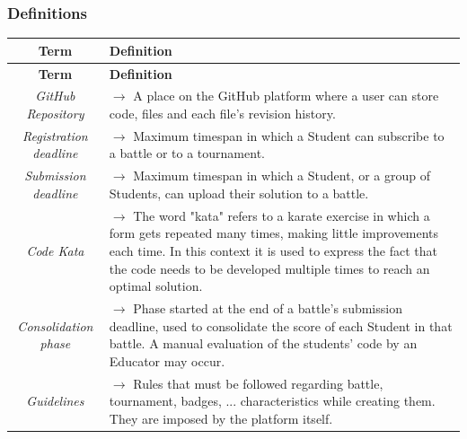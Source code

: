 \documentclass{article}
\begin{document}
\subsubsection{Definitions}
{\renewcommand{\arraystretch}{1.5}
\begin{xltabular}{\textwidth}{ >{\raggedright\arraybackslash}c >{\raggedright\arraybackslash}X }
    \hline
    \textbf{Term} & \textbf{Definition} \\
    \hline

    \endfirsthead   %

    \hline
    \textbf{Term} & \textbf{Definition} \\
    \hline

    \endhead    %

    \endfoot    %

    \endlastfoot    %

    \textit{GitHub Repository} & $\rightarrow$ A place on the GitHub platform where a user can store code, files and each file's revision history. \\
    \textit{Registration deadline} & $\rightarrow$ Maximum timespan in which a Student can subscribe to a battle or to a tournament. \\
    \textit{Submission deadline} & $\rightarrow$ Maximum timespan in which a Student, or a group of Students, can upload their solution to a battle. \\
    \textit{Code Kata} & $\rightarrow$ The word "kata" refers to a karate exercise in which a form gets repeated many times, 
    making little improvements each time.
    In this context it is used to express the fact that the code needs to be developed multiple times to reach an optimal solution. \\
    \textit{Consolidation phase} & $\rightarrow$ Phase started at the end of a battle's submission deadline, used to consolidate the score of each Student 
    in that battle. A manual evaluation of the students' code by an Educator may occur. \\
    \textit{Guidelines} & $\rightarrow$ Rules that must be followed regarding battle, tournament, badges, ... characteristics while creating
    them. They are imposed by the platform itself.
\end{xltabular}

}
\end{document}
